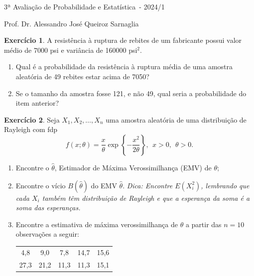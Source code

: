 \documentclass[]{article}
\newcommand{\avaliacao}{3}
\newcommand{\disciplina}{Probabilidade e Estatística}
\newcommand{\semestre}{2024/1}
\theoremstyle{definition}
\newtheorem{ex}{Exercício}
\begin{document}
\thispagestyle{empty}
\begin{center}
\Large{\avaliacao ª Avaliação de \disciplina\ - \semestre}

\large{Prof. Dr. Alessandro José Queiroz Sarnaglia}
\end{center}

\begin{ex}
A resistência à ruptura de rebites de um fabricante possui valor médio de 7000 psi e variância de 160000 psi$^2$.
\begin{enumerate}
	\item Qual é a probabilidade da resistência à ruptura média de uma amostra aleatória de 49 rebites estar acima de 7050?%
	\item Se o tamanho da amostra fosse 121, e não 49, qual seria a probabilidade do item anterior?%
\end{enumerate}
\end{ex}


\begin{ex}
Seja $X_1, X_2, \ldots, X_n$ uma amostra aleatória de uma distribuição de Rayleigh com fdp
$$
f(x;\theta) = \frac{x}{\theta}\exp\left\{-\frac{x^2}{2\theta}\right\}, \ \ x > 0, \ \ \theta>0.
$$
\begin{enumerate}
	\item Encontre o $\hat\theta$, Estimador de Máxima Verossimilhança (EMV) de $\theta$;%
	\item Encontre o vício $B(\hat{\theta})$ do EMV $\hat{\theta}$. \textit{Dica: Encontre $E(X_i^2)$, lembrando que cada $X_i$ também têm distribuição de Rayleigh e que a esperança da soma é a soma das esperanças.}%
	\item Encontre a estimativa de máxima verossimilhança de $\theta$ a partir das $n = 10$ observações a seguir:
	\begin{center}
		\begin{tabular}{ccccc}
			4,8 & 9,0 & 7,8 &14,7 &15,6\\
			27,3&21,2 &11,3 &11,3 &15,1\\
		\end{tabular}
	\end{center}
\end{enumerate}
\end{ex}
\end{document}
